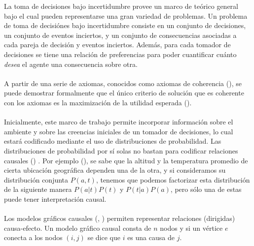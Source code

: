 \documentclass[11pt]{article}
\theoremstyle{plain}
\begin{document}
La toma de decisiones bajo incertidumbre provee un marco de teórico general bajo el cual pueden representarse una gran variedad de problemas. Un problema de toma de decisiónes bajo incertidumbre consiste en un conjunto de decisiones, un conjunto de eventos inciertos, y un conjunto de consecuencias asociadas a cada pareja de decisión y eventos inciertos. Además, para cada tomador de decisiones se tiene una relación de preferencias para poder cuantificar cuánto \textit{desea} el agente una consecuencia sobre otra.\\
\\
A partir de una serie de axiomas, conocidos como axiomas de coherencia (\cite{bernardo2000bayesian}), se puede demostrar formalmente que el único criterio de solución que es coherente con los axiomas es la maximización de la utilidad esperada (\cite{savage1954the}).\\ 
\\
Inicialmente, este marco de trabajo permite incorporar información sobre el ambiente y sobre las creencias iniciales de un tomador de decisiones, lo cual estará codificado mediante el uso de distribuciones de probabilidad. Las distribuciones de probabilidad por sí solas no bastan para codificar relaciones causales (\cite{pearl2009causality}) . Por ejemplo (\cite{peters2017elements}), se sabe que la altitud y la temperatura promedio de cierta ubicación geográfica dependen una de la otra, y si consideramos su distribución conjunta $P(a,t)$, tenemos que podemos factorizar esta distribución de la siguiente manera $P(a|t)P(t)$ y $P(t|a)P(a)$, pero sólo una de estas puede tener interpretación causal.\\
\\
Los modelos gráficos causales (\cite{pearl2009causality}, \cite{koller2009probabilistic}) permiten representar relaciones (dirigidas) causa-efecto. Un modelo gráfico causal consta de $n$ nodos y si un vértice $e$ conecta a los nodos $(i,j)$ se dice que $i$ es una causa de $j$. 
\end{document}
